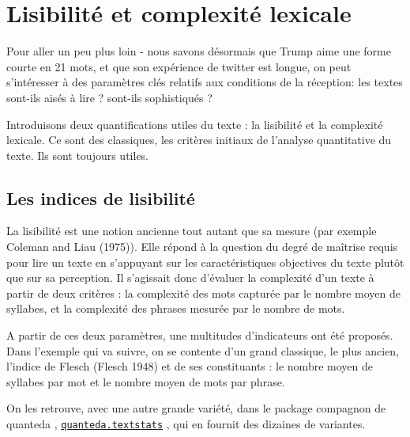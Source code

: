 \documentclass[
  letterpaper,
  DIV=11,
  numbers=noendperiod]{scrreprt}
\begin{document}
\section{Lisibilité et complexité
lexicale}\label{lisibilituxe9-et-complexituxe9-lexicale}

Pour aller un peu plus loin - nous savons désormais que Trump aime une
forme courte en 21 mots, et que son expérience de twitter est longue, on
peut s'intéresser à des paramètres clés relatifs aux conditions de la
réception: les textes sont-ils aisés à lire ? sont-ils sophistiqués ?

Introduisons deux quantifications utiles du texte : la lisibilité et la
complexité lexicale. Ce sont des classiques, les critères initiaux de
l'analyse quantitative du texte. Ils sont toujours utiles.

\subsection{Les indices de
lisibilité}\label{les-indices-de-lisibilituxe9}

La lisibilité est une notion ancienne tout autant que sa mesure (par
exemple Coleman and Liau (1975)). Elle répond à la question du degré de
maîtrise requis pour lire un texte en s'appuyant sur les
caractéristiques objectives du texte plutôt que sur sa perception. Il
s'agissait donc d'évaluer la complexité d'un texte à partir de deux
critères : la complexité des mots capturée par le nombre moyen de
syllabes, et la complexité des phrases mesurée par le nombre de mots.

A partir de ces deux paramètres, une multitudes d'indicateurs ont été
proposés. Dans l'exemple qui va suivre, on se contente d'un grand
classique, le plus ancien, l'indice de Flesch (Flesch 1948) et de ses
constituants : le nombre moyen de syllabes par mot et le nombre moyen de
mots par phrase.

On les retrouve, avec une autre grande variété, dans le package
compagnon de quanteda ,
\href{https://quanteda.io/reference/textstat_readability.html}{\texttt{quanteda.textstats}}
, qui en fournit des dizaines de variantes.
\end{document}
